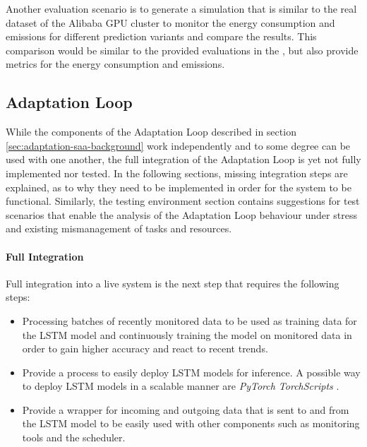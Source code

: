             Another evaluation scenario is to generate a simulation that is similar to the real dataset of the Alibaba GPU cluster to monitor the energy consumption and \COTWO emissions for different prediction variants and compare the results.
            This comparison would be similar to the provided evaluations in the , but also provide metrics for the energy consumption and \COTWO emissions.

        \subsection{Adaptation Loop}
        \label{sec:adaptation-loop-future-work}

            While the components of the Adaptation Loop described in section \ref{sec:adaptation-saa-background} work independently and to some degree can be used with one another, the full integration of the Adaptation Loop is yet not fully implemented nor tested.
            In the following sections, missing integration steps are explained, as to why they need to be implemented in order for the system to be functional.
            Similarly, the testing environment section contains suggestions for test scenarios that enable the analysis of the Adaptation Loop behaviour under stress and existing mismanagement of tasks and resources.

            \paragraph{Full Integration}
            Full integration into a live system is the next step that requires the following steps:
            \begin{itemize}
                \item Processing batches of recently monitored data to be used as training data for the LSTM model and continuously training the model on monitored data in order to gain higher accuracy and react to recent trends.
                \item Provide a process to easily deploy LSTM models for inference. A possible way to deploy LSTM models in a scalable manner are \emph{PyTorch TorchScripts} \cite{inkawhichSavingLoadingModels}.
                \item Provide a wrapper for incoming and outgoing data that is sent to and from the LSTM model to be easily used with other components such as monitoring tools and the \CMATCH scheduler.
            \end{itemize}


